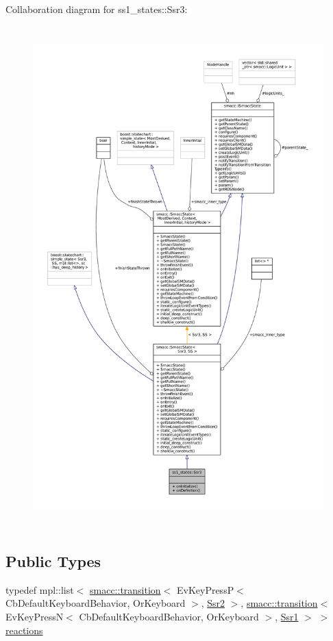 Collaboration diagram for ss1\+\_\+states\+:\+:Ssr3\+:
\nopagebreak
\begin{figure}[H]
\begin{center}
\leavevmode
\includegraphics[height=550pt]{structss1__states_1_1Ssr3__coll__graph}
\end{center}
\end{figure}
\subsection*{Public Types}
\begin{DoxyCompactItemize}
\item 
typedef mpl\+::list$<$ \hyperlink{classsmacc_1_1transition}{smacc\+::transition}$<$ Ev\+Key\+PressP$<$ Cb\+Default\+Keyboard\+Behavior, Or\+Keyboard $>$, \hyperlink{structss1__states_1_1Ssr2}{Ssr2} $>$, \hyperlink{classsmacc_1_1transition}{smacc\+::transition}$<$ Ev\+Key\+PressN$<$ Cb\+Default\+Keyboard\+Behavior, Or\+Keyboard $>$, \hyperlink{structss1__states_1_1Ssr1}{Ssr1} $>$ $>$ \hyperlink{structss1__states_1_1Ssr3_a6bf2881b46152e751f7807392b31fa74}{reactions}
\end{DoxyCompactItemize}
